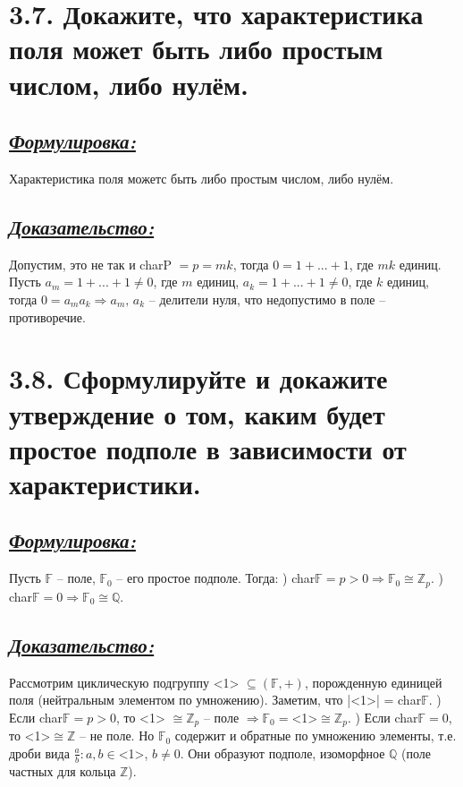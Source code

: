 \documentclass{article}
\begin{document}
\section*{\LARGE 3.7. Докажите, что характеристика поля может быть либо простым числом, либо нулём. }
\subsection*{\Large \underline{\textit{Формулировка: }}}
Характеристика поля можетс быть либо простым числом, либо нулём.

\subsection*{\Large \underline{\textit{Доказательство: }}}
Допустим, это не так и charP $ = p = m k$, тогда $0 = 1 + ... + 1$, где $mk$ единиц. Пусть $a_m = 1 + ... + 1 \ne 0$, где $m$ единиц, $a_k = 1 + ... + 1 \ne 0$, где $k$ единиц, тогда $0 = a_m a_k \Rightarrow a_m,\, a_k$ -- делители нуля, что недопустимо в поле -- противоречие.

\section*{\LARGE 3.8. Сформулируйте и докажите утверждение о том, каким будет простое подполе в зависимости от характеристики. }
\subsection*{\Large \underline{\textit{Формулировка: }}}
Пусть $\mathbb{F}$ -- поле, $\mathbb{F}_0$ -- его простое подполе. Тогда:
\newline{}) char$\mathbb{F} = p > 0 \Rightarrow \mathbb{F}_0 \cong \mathbb{Z}_p$. 
\newline{}) char$\mathbb{F} = 0 \Rightarrow \mathbb{F}_0 \cong \mathbb{Q}$. 

\subsection*{\Large \underline{\textit{Доказательство:}}}
Рассмотрим циклическую подгруппу <1> $\subseteq (\mathbb{F}, +)$, порожденную единицей поля (нейтральным элементом по умножению). Заметим, что |<1>| = char$\mathbb{F}$.
) Если char$\mathbb{F} = p > 0$, то <1> $\cong \mathbb{Z}_p$ -- поле $\Rightarrow \mathbb{F}_0 = $<1>$\cong \mathbb{Z}_p$.
) Если char$\mathbb{F} = 0$, то <1>$\cong \mathbb{Z}$ -- не поле. Но $\mathbb{F}_0$ содержит и обратные по умножению элементы, т.е. дроби вида $\frac{a}{b} : a,b \in$<1>, $b \ne 0$. Они образуют подполе, изоморфное $\mathbb{Q}$ (поле частных для кольца $\mathbb{Z}$).
\end{document}
